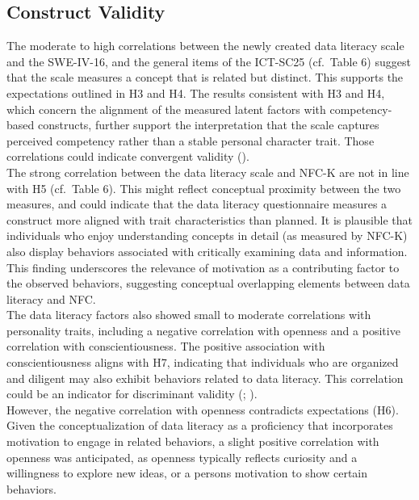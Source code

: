 \documentclass[
  12pt,
  a4paper,
  twoside]{article}
\begin{document}
\subsection{Construct Validity}\label{construct-validity}

The moderate to high correlations between the newly created data literacy scale and the SWE-IV-16, and the general items of the ICT-SC25 (cf.~Table 6) suggest that the scale measures a concept that is related but distinct.
This supports the expectations outlined in H3 and H4.
The results consistent with H3 and H4, which concern the alignment of the measured latent factors with competency-based constructs, further support the interpretation that the scale captures perceived competency rather than a stable personal character trait.
Those correlations could indicate convergent validity ().\\
The strong correlation between the data literacy scale and NFC-K are not in line with H5 (cf.~Table 6).
This might reflect conceptual proximity between the two measures, and could indicate that the data literacy questionnaire measures a construct more aligned with trait characteristics than planned.
It is plausible that individuals who enjoy understanding concepts in detail (as measured by NFC-K) also display behaviors associated with critically examining data and information. This finding underscores the relevance of motivation as a contributing factor to the observed behaviors, suggesting conceptual overlapping elements between data literacy and NFC.\\
The data literacy factors also showed small to moderate correlations with personality traits, including a negative correlation with openness and a positive correlation with conscientiousness. The positive association with conscientiousness aligns with H7, indicating that individuals who are organized and diligent may also exhibit behaviors related to data literacy.
This correlation could be an indicator for discriminant validity (; ).\\
However, the negative correlation with openness contradicts expectations (H6).
Given the conceptualization of data literacy as a proficiency that incorporates motivation to engage in related behaviors, a slight positive correlation with openness was anticipated, as openness typically reflects curiosity and a willingness to explore new ideas, or a persons motivation to show certain behaviors.
\end{document}
